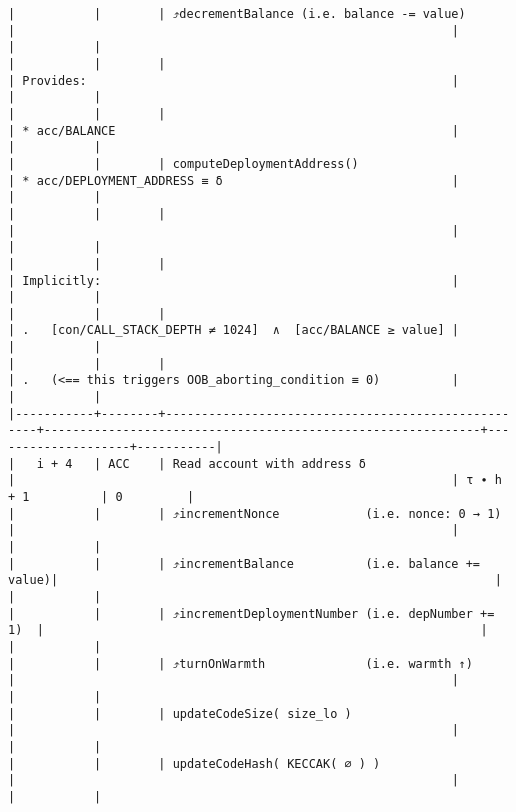 \documentclass[varwidth=\maxdimen,margin=0.5cm,multi={verbatim}]{standalone}
\begin{document}
\begin{verbatim}
|           |        | ⤴️decrementBalance (i.e. balance -= value)         |                                                             |                    |           |
|           |        |                                                    | Provides:                                                   |                    |           |
|           |        |                                                    | * acc/BALANCE                                               |                    |           |
|           |        | computeDeploymentAddress()                         | * acc/DEPLOYMENT_ADDRESS ≡ δ                                |                    |           |
|           |        |                                                    |                                                             |                    |           |
|           |        |                                                    | Implicitly:                                                 |                    |           |
|           |        |                                                    | .   [con/CALL_STACK_DEPTH ≠ 1024]  ∧  [acc/BALANCE ≥ value] |                    |           |
|           |        |                                                    | .   (<== this triggers OOB_aborting_condition ≡ 0)          |                    |           |
|-----------+--------+----------------------------------------------------+-------------------------------------------------------------+--------------------+-----------|
|   i + 4   | ACC    | Read account with address δ                        |                                                             | τ ∙ h + 1          | 0         |
|           |        | ⤴️incrementNonce            (i.e. nonce: 0 → 1)    |                                                             |                    |           |
|           |        | ⤴️incrementBalance          (i.e. balance += value)|                                                             |                    |           |
|           |        | ⤴️incrementDeploymentNumber (i.e. depNumber += 1)  |                                                             |                    |           |
|           |        | ⤴️turnOnWarmth              (i.e. warmth ↑)        |                                                             |                    |           |
|           |        | updateCodeSize( size_lo )                          |                                                             |                    |           |
|           |        | updateCodeHash( KECCAK( ∅ ) )                      |                                                             |                    |           |

\end{verbatim}
\end{document}
